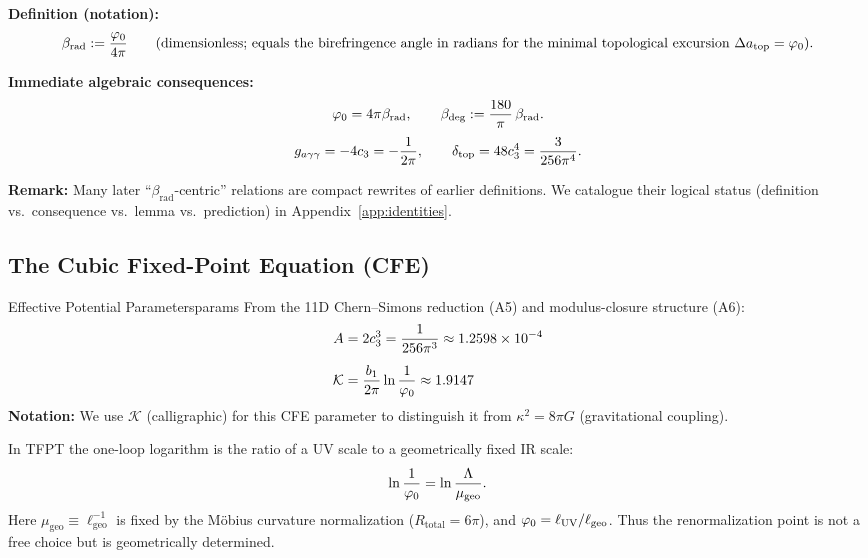 \begin{tcolorbox}[colback=gray!5, colframe=gray!60, 
    title={\textbf{Dictionary: $\beta_{\text{rad}}$ and Canonical Consequences}}, fonttitle=\bfseries\small]
\textbf{Definition (notation):}
\begin{equation}
    \beta_{\text{rad}} := \frac{\varphi_0}{4\pi}
    \qquad\text{(dimensionless; equals the birefringence angle in radians for the minimal topological excursion $\Delta a_{\text{top}}=\varphi_0$).}
\end{equation}

\textbf{Immediate algebraic consequences:}
\begin{equation}
    \varphi_0 = 4\pi\beta_{\text{rad}}, 
    \qquad 
    \beta_{\text{deg}} := \frac{180}{\pi}\,\beta_{\text{rad}}.
\end{equation}
\begin{equation}
    g_{a\gamma\gamma} = -4c_3 = -\frac{1}{2\pi},
    \qquad
    \delta_{\mathrm{top}} = 48c_3^4 = \frac{3}{256\pi^4}.
\end{equation}

\textbf{Remark:} Many later ``$\beta_{\text{rad}}$-centric'' relations are compact rewrites of earlier definitions. 
We catalogue their logical status (definition vs.\ consequence vs.\ lemma vs.\ prediction) in Appendix~\ref{app:identities}.
\end{tcolorbox}

\subsection{The Cubic Fixed-Point Equation (CFE)}

\begin{definition}{Effective Potential Parameters}{params}
From the 11D Chern--Simons reduction (A5) and modulus-closure structure (A6):
\begin{align}
    A &= 2c_3^3 = \frac{1}{256\pi^3} \approx 1.2598 \times 10^{-4}\\[0.5em]
    \mathcal{K} &= \frac{b_1}{2\pi}\ln\frac{1}{\varphi_0} \approx 1.9147
\end{align}
\textbf{Notation:} We use $\mathcal{K}$ (calligraphic) for this CFE parameter to 
distinguish it from $\kappa^2 = 8\pi G$ (gravitational coupling).
\end{definition}

\begin{tcolorbox}[colback=gray!5, colframe=gray!60,
    title={\textbf{Lemma (Geometric Fixing of the Log)}}, fonttitle=\bfseries\small]
In TFPT the one-loop logarithm is the ratio of a UV scale to a geometrically fixed IR scale:
\begin{equation}
    \ln\frac{1}{\varphi_0} = \ln\frac{\Lambda}{\mu_{\text{geo}}}.
\end{equation}
Here $\mu_{\text{geo}} \equiv \ell_{\text{geo}}^{-1}$ is fixed by the M\"obius curvature
normalization ($R_{\text{total}}=6\pi$), and $\varphi_0 = \ell_{\text{UV}}/\ell_{\text{geo}}$.
Thus the renormalization point is not a free choice but is geometrically determined.
\end{tcolorbox}

